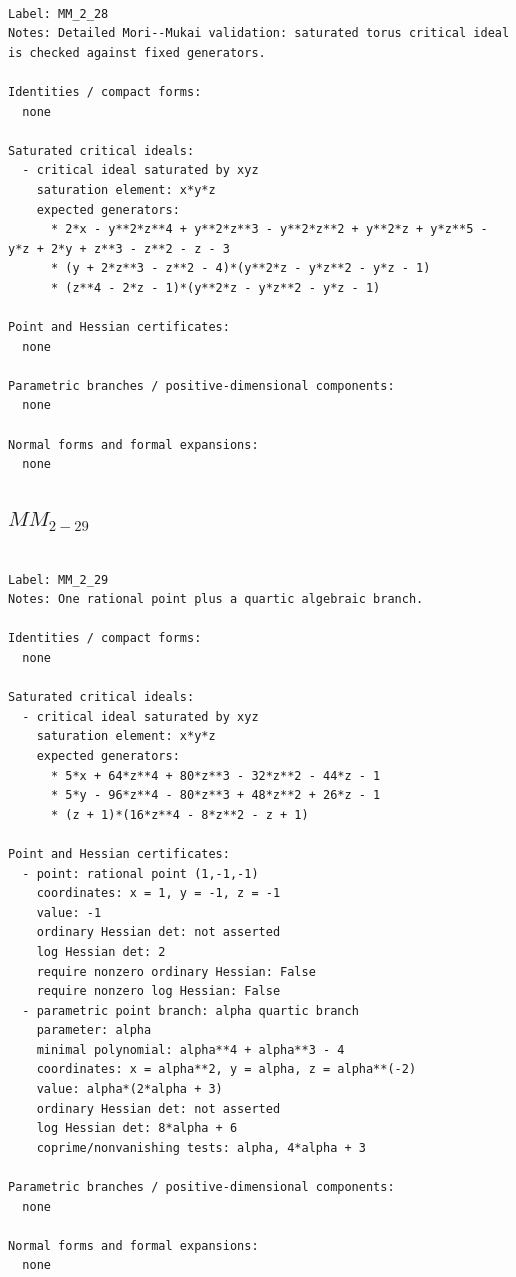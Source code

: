 \documentclass[10pt,a4paper]{article}
\begin{document}
\begin{lstlisting}

Label: MM_2_28
Notes: Detailed Mori--Mukai validation: saturated torus critical ideal is checked against fixed generators.

Identities / compact forms:
  none

Saturated critical ideals:
  - critical ideal saturated by xyz
    saturation element: x*y*z
    expected generators:
      * 2*x - y**2*z**4 + y**2*z**3 - y**2*z**2 + y**2*z + y*z**5 - y*z + 2*y + z**3 - z**2 - z - 3
      * (y + 2*z**3 - z**2 - 4)*(y**2*z - y*z**2 - y*z - 1)
      * (z**4 - 2*z - 1)*(y**2*z - y*z**2 - y*z - 1)

Point and Hessian certificates:
  none

Parametric branches / positive-dimensional components:
  none

Normal forms and formal expansions:
  none

\end{lstlisting}

\subsection*{$ MM_{2-29} $}

\begin{lstlisting}

Label: MM_2_29
Notes: One rational point plus a quartic algebraic branch.

Identities / compact forms:
  none

Saturated critical ideals:
  - critical ideal saturated by xyz
    saturation element: x*y*z
    expected generators:
      * 5*x + 64*z**4 + 80*z**3 - 32*z**2 - 44*z - 1
      * 5*y - 96*z**4 - 80*z**3 + 48*z**2 + 26*z - 1
      * (z + 1)*(16*z**4 - 8*z**2 - z + 1)

Point and Hessian certificates:
  - point: rational point (1,-1,-1)
    coordinates: x = 1, y = -1, z = -1
    value: -1
    ordinary Hessian det: not asserted
    log Hessian det: 2
    require nonzero ordinary Hessian: False
    require nonzero log Hessian: False
  - parametric point branch: alpha quartic branch
    parameter: alpha
    minimal polynomial: alpha**4 + alpha**3 - 4
    coordinates: x = alpha**2, y = alpha, z = alpha**(-2)
    value: alpha*(2*alpha + 3)
    ordinary Hessian det: not asserted
    log Hessian det: 8*alpha + 6
    coprime/nonvanishing tests: alpha, 4*alpha + 3

Parametric branches / positive-dimensional components:
  none

Normal forms and formal expansions:
  none

\end{lstlisting}
\end{document}
